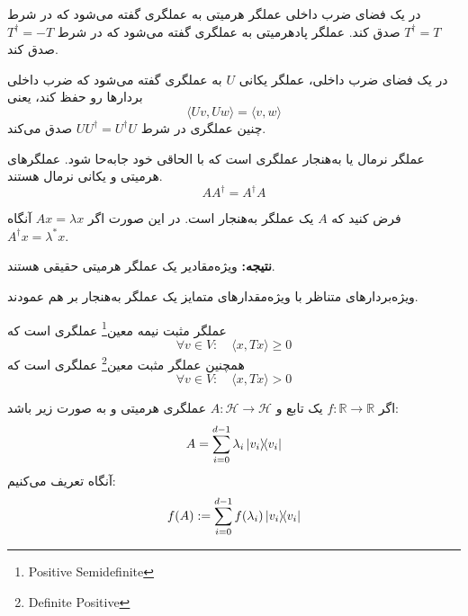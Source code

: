       \begin{definition}
     در یک فضای ضرب داخلی عملگر هرمیتی به عملگری گفته می‌شود که در شرط $T^{\dagger} = T$ صدق کند. عملگر پادهرمیتی به عملگری گفته می‌شود که در شرط $T^{\dagger} = -T$ صدق کند. 
     \end{definition}
     \begin{definition}
     در یک فضای ضرب داخلی، عملگر یکانی $U$ به عملگری گفته می‌شود که ضرب داخلی بردارها رو حفظ کند، یعنی 
      \begin{equation}
      	\langle Uv,Uw \rangle = \langle v,w \rangle
      \end{equation}
      چنین عملگری در شرط $UU^{\dagger} = U^{\dagger}U$ صدق می‌کند. 
      \end{definition}
      \begin{definition}
      عملگر نرمال یا به‌هنجار عملگری است که با الحاقی خود جابه‌حا شود. عملگرهای هرمیتی و یکانی نرمال هستند. 
      \begin{equation}
      	AA^{\dagger} = A^{\dagger}A
      \end{equation}
      \end{definition}
      \begin{theorem}
      فرض کنید که $A$ یک عملگر به‌هنجار است. در این صورت اگر $Ax = \lambda x$ آنگاه $A^{\dagger} x = \lambda^{*} x$.
      \end{theorem}
      \textbf{نتیجه: }
      ویژه‌مقادیر یک عملگر هرمیتی حقیقی هستند. 
      
      \begin{theorem}
      ویژه‌بردارهای متناظر با ویژه‌مقدارهای متمایز یک عملگر به‌هنجار بر هم عمودند. 
      \end{theorem}
      \begin{definition}
      عملگر مثبت نیمه معین\footnote{Positive Semidefinite} عملگری است که
       \begin{equation}
       	\forall v \in V: \quad \langle x,Tx \rangle \geq 0
       \end{equation}
       همچنین عملگر مثبت معین\footnote{Definite Positive} عملگری است که
        \begin{equation}
       	\forall v \in V: \quad \langle x,Tx \rangle > 0
       \end{equation} 
       \end{definition}

  اگر $f: \mathbb{R} \rightarrow \mathbb{R}$ یک تابع و $A: \mathcal{H} \to \mathcal{H}$ عملگری هرمیتی و به صورت زیر باشد:
    \begin{equation}
    	A = \sum_{i=0}^{d-1} \lambda_{i} \dyad{v_{i}}{v_{i}}
    \end{equation}
    آنگاه تعریف می‌کنیم: 
    \begin{equation}
    	f(A) := \sum_{i=0}^{d-1} f(\lambda_{i}) \dyad{v_{i}}{v_{i}}
    \end{equation}
    
